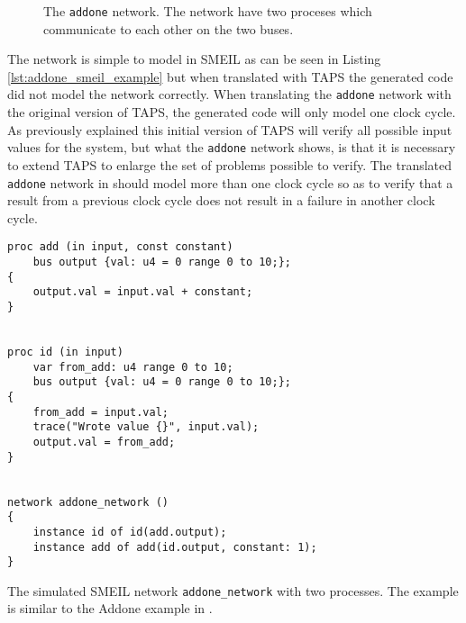 \begin{figure}
    \centering
    \caption{The \texttt{addone} network. The network have two proceses which communicate to each other on the two buses.}
    \label{fig:addone_unclocked}
\end{figure}
The network is simple to model in SMEIL as can be seen in Listing \ref{lst:addone_smeil_example} but when translated with TAPS the generated \cspm{} code did not model the network correctly. When translating the \texttt{addone} network with the original version of TAPS, the generated \cspm{} code will only model one clock cycle. As previously explained%
this initial version of TAPS will verify all possible input values for the system, but what the \texttt{addone} network shows, is that it is necessary to extend TAPS to enlarge the set of problems possible to verify. The translated \texttt{addone} network in \cspm{} should model more than one clock cycle so as to verify that a result from a previous clock cycle does not result in a failure in another clock cycle.
\begin{listing}
\begin{verbatim}
proc add (in input, const constant)
    bus output {val: u4 = 0 range 0 to 10;};
{
    output.val = input.val + constant;
}


proc id (in input)
    var from_add: u4 range 0 to 10;
    bus output {val: u4 = 0 range 0 to 10;};
{
    from_add = input.val;
    trace("Wrote value {}", input.val);
    output.val = from_add;
}


network addone_network ()
{
    instance id of id(add.output);
    instance add of add(id.output, constant: 1);
}
\end{verbatim}
\caption{The simulated SMEIL network \texttt{addone\_network} with two processes. The example is similar to the Addone example in \cite{smeil}.}
\label{lst:addone_smeil_example}
\end{listing}
